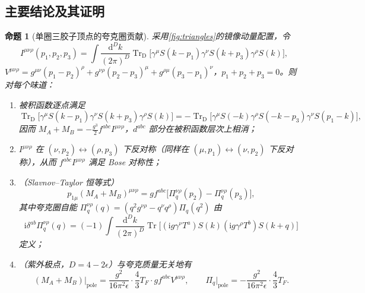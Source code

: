\documentclass[UTF8,a4paper,11pt,fontset=fandol]{ctexart}
\theoremstyle{cplain}
\newtheorem{proposition}[theorem]{命题}
\theoremstyle{cdefinition}
\theoremstyle{cremark}
\numberwithin{equation}{section}
\DeclareMathOperator{\Tr}{Tr}
\newcommand{\TrD}{\operatorname{Tr}_{\mathrm{D}}}   %
\newcommand{\dd}{\mathrm{d}}                         %
\newcommand{\ii}{\mathrm{i}}                        %
\begin{document}
\subsection{主要结论及其证明}\label{sec:triangle-proof}

\begin{proposition}[单圈三胶子顶点的夸克圈贡献]\label{prop:triangle}
采用\cref{fig:triangles}的镜像动量配置，令
\[
I^{\mu\nu\rho}(p_1,p_2,p_3)=\int\frac{\dd^Dk}{(2\pi)^D}\TrD\bigl[\gamma^\mu S(k-p_1)\gamma^\nu S(k+p_3)\gamma^\rho S(k)\bigr],
\]
$V^{\mu\nu\rho}=g^{\mu\nu}(p_1-p_2)^\rho+g^{\nu\rho}(p_2-p_3)^\mu+g^{\rho\mu}(p_3-p_1)^\nu$，$p_1+p_2+p_3=0$。则对每个味道：
\begin{enumerate}[label=(\roman*)]
\item 被积函数逐点满足
\begin{equation}\label{eq:triangle-integrand}
\TrD\bigl[\gamma^\mu S(k-p_1)\gamma^\nu S(k+p_3)\gamma^\rho S(k)\bigr]=-\TrD\bigl[\gamma^\mu S(-k)\gamma^\rho S(-k-p_3)\gamma^\nu S(p_1-k)\bigr],
\end{equation}
因而 $M_A+M_B=-\tfrac{g^3}{2}f^{abc}I^{\mu\nu\rho}$，$d^{abc}$ 部分在被积函数层次上相消；
\item $I^{\mu\nu\rho}$ 在 $(\nu,p_2)\leftrightarrow(\rho,p_3)$ 下反对称（同样在 $(\mu,p_1)\leftrightarrow(\nu,p_2)$ 下反对称），从而 $f^{abc}I^{\mu\nu\rho}$ 满足 Bose 对称性；
\item （Slavnov--Taylor 恒等式）
\begin{equation}\label{eq:triangle-STI}
p_{1\mu}(M_A+M_B)^{\mu\nu\rho}=g f^{abc}\bigl[\Pi_q^{\nu\rho}(p_2)-\Pi_q^{\nu\rho}(p_3)\bigr],
\end{equation}
其中夸克圈自能 $\Pi_q^{\nu\rho}(q)=(q^2g^{\nu\rho}-q^\nu q^\rho)\Pi_q(q^2)$ 由
\begin{equation}\label{eq:quark-self-energy}
\ii\delta^{ab}\Pi_q^{\nu\rho}(q)=(-1)\int\frac{\dd^Dk}{(2\pi)^D}\Tr\bigl[(\ii g\gamma^\nu T^a)S(k)(\ii g\gamma^\rho T^b)S(k+q)\bigr]
\end{equation}
定义；
\item （紫外极点，$D=4-2\epsilon$）与夸克质量无关地有
\begin{equation}\label{eq:triangle-pole}
(M_A+M_B)\big|_{\mathrm{pole}}=\frac{g^2}{16\pi^2\epsilon}\cdot\frac43T_F\cdot g f^{abc}V^{\mu\nu\rho},\qquad
\Pi_q\big|_{\mathrm{pole}}=-\frac{g^2}{16\pi^2\epsilon}\cdot\frac43T_F .
\end{equation}
\end{enumerate}
\end{proposition}
\end{document}
